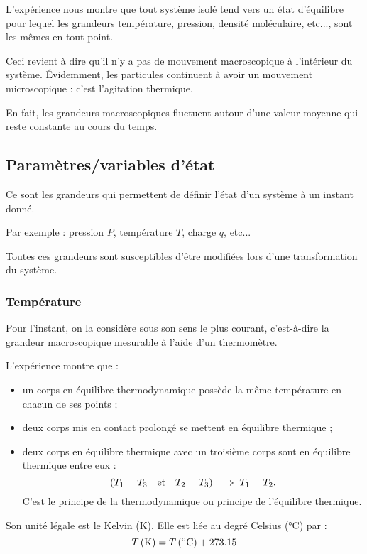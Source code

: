 L'expérience nous montre que tout système isolé tend vers un état d'équilibre pour lequel les grandeurs température, pression, densité moléculaire, etc..., sont les mêmes en tout point.

Ceci revient à dire qu'il n'y a pas de mouvement macroscopique à l'intérieur du système. Évidemment, les particules continuent à avoir un mouvement microscopique : c'est l'agitation thermique.

En fait, les grandeurs macroscopiques fluctuent autour d'une valeur moyenne qui reste constante au cours du temps.

\subsection{Paramètres/variables d'état}

Ce sont les grandeurs qui permettent de définir l'état d'un système à un instant donné.

Par exemple : pression \(P\), température \(T\), charge \(q\), etc...

Toutes ces grandeurs sont susceptibles d'être modifiées lors d'une transformation du système.

\subsubsection{Température}

Pour l'instant, on la considère sous son sens le plus courant, c'est-à-dire la grandeur macroscopique mesurable à l'aide d'un thermomètre.

L'expérience montre que : \begin{itemize}
\item un corps en équilibre thermodynamique possède la même température en chacun de ses points ;

\item deux corps mis en contact prolongé se mettent en équilibre thermique ;

\item deux corps en équilibre thermique avec un troisième corps sont en équilibre thermique entre eux : \[\left(T_1=T_3\quad\text{et}\quad T_2=T_3\right)\implies T_1=T_2.\] C'est le principe  de la thermodynamique ou principe de l'équilibre thermique.\\
\end{itemize}

Son unité légale est le Kelvin (\(\unit{\kelvin}\)). Elle est liée au degré Celsius (\(\unit{\degreeCelsius}\)) par : \[T\paren{\unit{\kelvin}}=T\paren{\unit{\degreeCelsius}}+\num{273.15}\]

